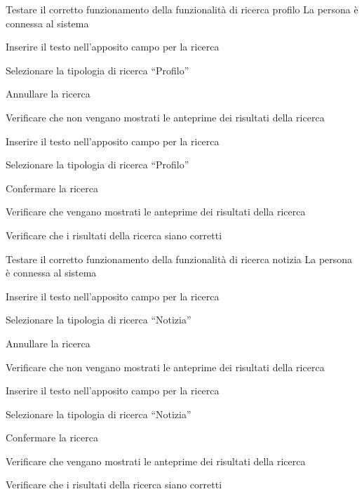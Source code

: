 
{Testare il corretto funzionamento della funzionalità di ricerca profilo}
{La persona è connessa al sistema}
{\begin{enumCU}
	\item Inserire il testo nell'apposito campo per la ricerca
	\item Selezionare la tipologia di ricerca ``Profilo''
	\item Annullare la ricerca
	\item Verificare che non vengano mostrati le anteprime dei risultati della ricerca
	\item Inserire il testo nell'apposito campo per la ricerca
	\item Selezionare la tipologia di ricerca ``Profilo''
	\item Confermare la ricerca
	\item Verificare che vengano mostrati le anteprime dei risultati della ricerca
	\item Verificare che i risultati della ricerca siano corretti
\end{enumCU}}


{Testare il corretto funzionamento della funzionalità di ricerca notizia}
{La persona è connessa al sistema}
{\begin{enumCU}
	\item Inserire il testo nell'apposito campo per la ricerca
	\item Selezionare la tipologia di ricerca ``Notizia''
	\item Annullare la ricerca
	\item Verificare che non vengano mostrati le anteprime dei risultati della ricerca
	\item Inserire il testo nell'apposito campo per la ricerca
	\item Selezionare la tipologia di ricerca ``Notizia''
	\item Confermare la ricerca
	\item Verificare che vengano mostrati le anteprime dei risultati della ricerca
	\item Verificare che i risultati della ricerca siano corretti
\end{enumCU}}





